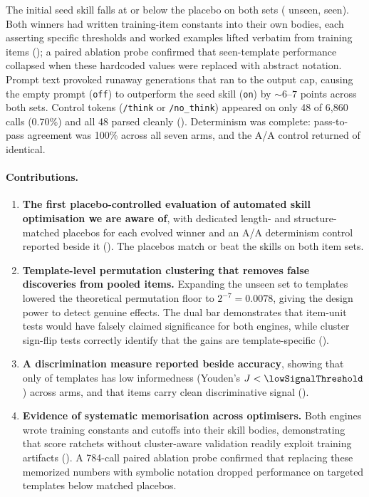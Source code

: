 The initial seed skill falls at or below the placebo on both sets
(\NUM{\effectUnseenOn} unseen, \NUM{\effectSeenOn} seen). Both winners had
written training-item constants into their own bodies, each asserting specific
thresholds and worked examples lifted verbatim from training items
(); a paired ablation probe confirmed that seen-template
performance collapsed when these hardcoded values were replaced with abstract
notation. Prompt text provoked runaway generations that ran
to the output cap, causing the empty prompt (\texttt{off}) to outperform the
seed skill (\texttt{on}) by $\sim 6$--$7$ points across both sets.
Control tokens (\texttt{/think} or \texttt{/no\_think}) appeared on only 48 of
6,860 calls (0.70\%) and all 48 parsed cleanly ().
Determinism was complete: pass-to-pass agreement was 100\% across all seven arms,
and the A/A control returned \NUM{\aaPairs} of \NUM{\aaPairs} identical.

\paragraph{Contributions.}
\begin{enumerate}
  \item \textbf{The first placebo-controlled evaluation of automated skill
    optimisation we are aware of}, with dedicated length- and structure-matched
    placebos for each evolved winner and an A/A determinism control reported
    beside it (). The placebos match or beat the skills on
    both item sets.
  \item \textbf{Template-level permutation clustering that removes false
    discoveries from pooled items.} Expanding the unseen set to \NUM{\templatesUnseen} templates
    lowered the theoretical permutation floor to $2^{-7} = 0.0078$, giving the
    design power to detect genuine effects. The dual bar demonstrates that
    item-unit tests would have falsely claimed significance for both engines,
    while cluster sign-flip tests correctly identify that the gains are
    template-specific ().
  \item \textbf{A discrimination measure reported beside accuracy}, showing
    that only \NUM{\lowSignalTemplates} of \NUM{\studyTemplates} templates has
    low informedness (Youden's $J < \NUM{\lowSignalThreshold}$) across arms, and that
    \NUM{\signalItems} items carry clean discriminative signal ().
  \item \textbf{Evidence of systematic memorisation across optimisers.} Both
    engines wrote training constants and cutoffs into their skill bodies,
    demonstrating that score ratchets without cluster-aware validation readily
    exploit training artifacts (). A 784-call paired
    ablation probe confirmed that replacing these memorized numbers with symbolic
    notation dropped performance on targeted templates below matched placebos.
\end{enumerate}

